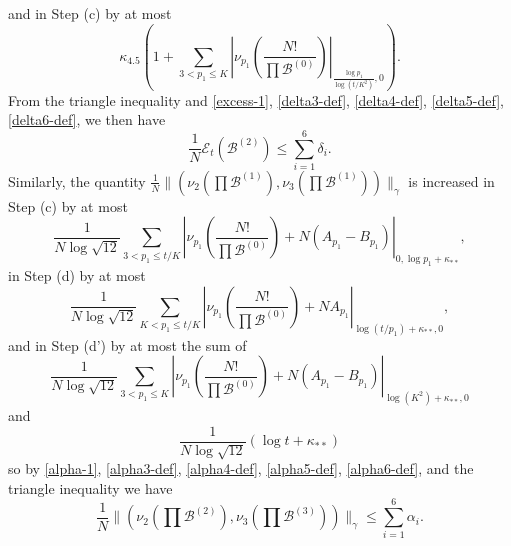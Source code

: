 \documentclass[12pt,a4paper,reqno]{amsart}
\numberwithin{equation}{section}
\theoremstyle{plain}
\theoremstyle{definition}
\newcommand\tuple{{\mathcal B}}
\newcommand\excess{{\mathcal{E}}}
\begin{document}
and in Step (c) by at most
$$ \kappa_{4.5} \left(1 + \sum_{3 < p_1 \leq K} \left|\nu_{p_1}\left( \frac{N!}{\prod \tuple^{(0)}} \right) \right|_{\frac{\log p_1}{\log(t/K^2)},0}\right).$$
From the triangle inequality and \eqref{excess-1}, \eqref{delta3-def}, \eqref{delta4-def}, \eqref{delta5-def}, \eqref{delta6-def}, we then have
\begin{equation}\label{excess-2}
   \frac{1}{N} \excess_t(\tuple^{(2)}) \leq \sum_{i=1}^6 \delta_i.
\end{equation}
Similarly, the quantity $\frac{1}{N} \| (\nu_2(\prod \tuple^{(1)}),\nu_3(\prod \tuple^{(1)}))\|_\gamma$ is increased in Step (c) by at most
$$\frac{1}{N\log \sqrt{12}} \sum_{3 < p_1 \leq t/K} \left|\nu_{p_1}\left( \frac{N!}{\prod \tuple^{(0)}} \right) + N(A_{p_1} - B_{p_1}) \right|_{0,\log p_1 + \kappa_{**}},$$
in Step (d) by at most
$$\frac{1}{N\log \sqrt{12}} \sum_{K < p_1 \leq t/K} \left|\nu_{p_1}\left( \frac{N!}{\prod \tuple^{(0)}} \right) + NA_{p_1} \right|_{\log(t/p_1) + \kappa_{**},0},$$
and in Step (d') by at most the sum of
$$\frac{1}{N\log \sqrt{12}} \sum_{3 < p_1 \leq K} \left|\nu_{p_1}\left( \frac{N!}{\prod \tuple^{(0)}} \right) + N(A_{p_1}-B_{p_1}) \right|_{\log(K^2) + \kappa_{**},0}$$
and
$$\frac{1}{N\log \sqrt{12}} \left( \log t + \kappa_{**} \right)$$
so by \eqref{alpha-1}, \eqref{alpha3-def}, \eqref{alpha4-def}, \eqref{alpha5-def}, \eqref{alpha6-def}, and the triangle inequality we have
\begin{equation}\label{alpha-2} 
\frac{1}{N} \| (\nu_2(\prod \tuple^{(2)}), \nu_3(\prod \tuple^{(3)})) \|_\gamma \leq \sum_{i=1}^6 \alpha_i.
\end{equation}
\end{document}
